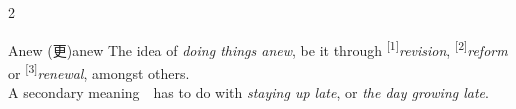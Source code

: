 \documentclass[10pt, a4paper]{ltjbook}
\begin{document}
\begin{multicols}{2}
\begin{glyph}{Anew (更)}{anew}\label{glyph:anew}
The idea of \textit{doing things anew}, be it through \textsuperscript{[1]}\textit{revision}, \textsuperscript{[2]}\textit{reform} or \textsuperscript{[3]}\textit{renewal}, amongst others.\\\hline
A secondary meaning　has to do with \textit{staying up late}, or \textit{the day growing late}.
\end{glyph}
\end{multicols}
\end{document}
